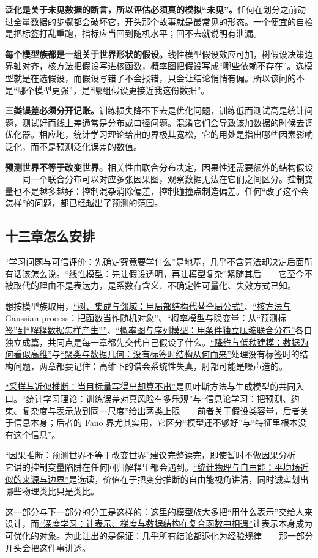 \textbf{泛化是关于未见数据的断言，所以评估必须真的模拟``未见''。}任何在划分之前动过全量数据的步骤都会破坏它，开头那个故事就是最常见的形态。一个便宜的自检是把标签打乱重跑，指标应当回到随机水平；回不去就说明有泄漏。

\textbf{每个模型族都是一组关于世界形状的假设。}线性模型假设效应可加，树假设决策边界轴对齐，核方法把假设写进核函数，概率图把假设写成``哪些依赖不存在''。选模型就是在选假设，而假设写错了不会报错，只会让结论悄悄有偏。所以该问的不是``哪个模型更强''，是``哪组假设更接近我这份数据''。

\textbf{三类误差必须分开记账。}训练损失降不下去是优化问题，训练低而测试高是统计问题，测试好而线上差通常是分布或口径问题。混淆它们会导致该加数据的时候去调优化器。相应地，统计学习理论给出的界极其宽松，它的用处是指出哪些因素影响泛化，而不是预测泛化误差的数值。

\textbf{预测世界不等于改变世界。}相关性由联合分布决定，因果性还需要额外的结构假设——同一个联合分布可以对应多张因果图，观察数据无法在它们之间区分。控制变量也不是越多越好：控制混杂消除偏差，控制碰撞点制造偏差。任何``改了这个会怎样''的问题，都已经越出了预测的范围。

\subsection{十三章怎么安排}

\hyperref[ch:109]{``学习问题与可信评价：先确定究竟要学什么''}是地基，几乎不含算法却决定后面所有话该怎么说。\hyperref[ch:110]{``线性模型：先让假设透明，再让模型复杂''}紧随其后——它至今不被取代的理由不是表达力，是系数有含义、不确定性可量化、失效方式已知。

想按模型族取用，\hyperref[ch:111]{``树、集成与邻域：用局部结构代替全局公式''}、\hyperref[ch:117]{``核方法与 Gaussian process：把函数当作随机对象''}、\hyperref[ch:114]{``概率模型与隐变量：从``预测标签''到``解释数据怎样产生''''}、\hyperref[ch:115]{``概率图与序列模型：用条件独立压缩联合分布''}各自独立成篇，共同点是每一章都先交代自己假设了什么。\hyperref[ch:112]{``降维与低秩建模：数据为何看似高维''}与\hyperref[ch:113]{``聚类与数据几何：没有标签时结构从何而来''}处理没有标签时的结构问题，两章都要记住：高维下的谱会系统性失真，肘部可能是噪声造的。

\hyperref[ch:116]{``采样与近似推断：当目标量写得出却算不出''}是贝叶斯方法与生成模型的共同入口。\hyperref[ch:118]{``统计学习理论：训练误差对真风险有多乐观''}与\hyperref[ch:119]{``信息论学习：把预测、约束、复杂度与表示放到同一尺度''}给出两类上限——前者关于假设类容量，后者关于信息本身；后者的 Fano 界尤其实用，它区分``模型还不够好''与``特征里根本没有这个信息''。

\hyperref[ch:120]{``因果推断：预测世界不等于改变世界''}建议完整读完，即使暂时不做因果分析——它讲的控制变量陷阱在任何回归解释里都会遇到。\hyperref[ch:121]{``统计物理与自由能：平均场近似的来源与边界''}是选读，价值在于把变分推断的自由能视角讲清，同时诚实划出哪些物理类比只是类比。

这一部分与下一部分的分工是这样的：这里的模型族大多把``用什么表示''交给人来设计，而\hyperref[ch:122]{``深度学习：让表示、梯度与数据结构在复合函数中相遇''}让表示本身成为可优化的对象。为此让出的是保证：几乎所有结论都退化为经验规律——那一部分开头会把这件事讲透。
